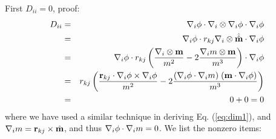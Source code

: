 \documentclass{article}
\begin{document}
First $D_{ii} = 0$, proof:
\begin{eqnarray*}
D_{ii} 
&=& \nabla_i \phi \cdot \nabla_i \otimes \nabla_i \phi \cdot \nabla_i \phi \\
&=& \nabla_i \phi \cdot r_{kj} \nabla_i \otimes \hat{\hat{\mathbf{m}}} \cdot \nabla_i \phi \\
&=& \nabla_i \phi \cdot r_{kj} 
    \left(
    \frac {\nabla_i \otimes \mathbf{m}} {m^2}
    - 2 \frac{\nabla_i m \otimes \mathbf{m}}{m^3} 
    \right)
  \cdot \nabla_i \phi \\
&=& r_{kj} \left(
    \frac {\mathbf{r}_{kj} \cdot \nabla_i \phi \times \nabla_i \phi} {m^2}
    - 2 \frac{(\nabla_i \phi \cdot \nabla_i m) \; (\mathbf{m} \cdot \nabla_i \phi)}{m^3} 
    \right) \\
&=& 0 + 0 = 0
\end{eqnarray*}
where we have used a similar technique in deriving Eq. (\ref{eq:dim1}),
and $\nabla_i m = \mathbf{r}_{kj} \times \hat{\mathbf{m}}$, 
and thus $\nabla_i \phi \cdot \nabla_i m = 0$.
We list the nonzero items:
\end{document}
